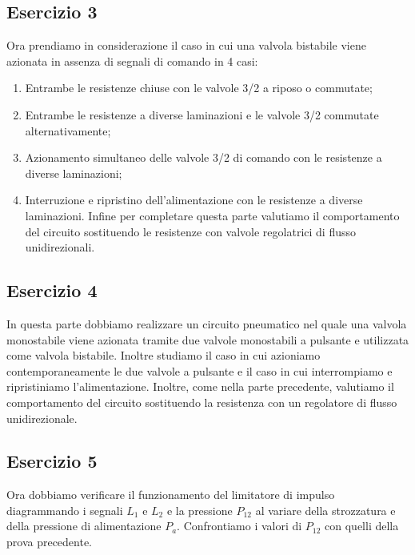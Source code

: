 \documentclass[a4paper]{article}
\begin{document}
\subsection{Esercizio 3}
Ora prendiamo in considerazione il caso in cui una valvola bistabile viene azionata in assenza di segnali di comando in 4 casi:
\begin{enumerate}
\item Entrambe le resistenze chiuse con le valvole 3/2 a riposo o commutate;
\item Entrambe le resistenze a diverse laminazioni e le valvole 3/2 commutate alternativamente;

\item Azionamento simultaneo delle valvole 3/2 di comando con le resistenze a diverse laminazioni;

\item Interruzione e ripristino dell’alimentazione con le resistenze a diverse laminazioni.
Infine per completare questa parte valutiamo il comportamento del circuito sostituendo le resistenze con valvole regolatrici di flusso unidirezionali.
\end{enumerate}

\subsection{Esercizio 4}
In questa parte dobbiamo realizzare un circuito pneumatico nel quale una valvola monostabile viene azionata tramite due valvole monostabili a pulsante e utilizzata come valvola bistabile. Inoltre studiamo il caso in cui azioniamo contemporaneamente le due valvole a pulsante e il caso in cui interrompiamo e ripristiniamo l’alimentazione.
Inoltre, come nella parte precedente, valutiamo il comportamento del circuito sostituendo la resistenza con un regolatore di flusso unidirezionale.

\subsection{Esercizio 5}
Ora dobbiamo verificare il funzionamento del limitatore di impulso diagrammando i segnali $L_1$ e $L_2$ e la pressione $P_{12}$ al variare della strozzatura e della pressione di alimentazione $P_a$. Confrontiamo i valori di $P_{12}$ con quelli della prova precedente.
\end{document}
